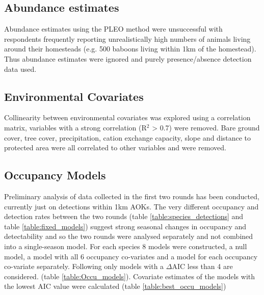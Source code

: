 \subsection{Abundance estimates}
Abundance estimates using the PLEO method were unsuccessful with respondents frequently reporting unrealistically high numbers of animals living around their homesteads (e.g. 500 baboons living within 1km of the homestead). Thus abundance estimates were ignored and purely presence/absence detection data used.

\subsection{Environmental Covariates}

Collinearity between environmental covariates was explored using a correlation matrix, variables with a strong correlation (R$^2$ > 0.7) were removed. Bare ground cover, tree cover, precipitation, cation exchange capacity, slope and distance to protected area were all correlated to other variables and were removed.

\subsection{Occupancy Models}
Preliminary analysis of data collected in the first two rounds has been conducted, currently just on detections within 1km AOKs. The very different occupancy and detection rates between the two rounds (table \ref{table:species_detections} and table \ref{table:fixed_models}) suggest strong seasonal changes in occupancy and detectability and so the two rounds were analysed separately and not combined into a single-season model. For each species 8 models were constructed, a null model, a model with all 6 occupancy co-variates and a model for each occupancy co-variate separately. Following \citet{Burnham2002} only models with a $\Delta$AIC less than 4 are considered. (table \ref{table:Occu_models}). Covariate estimates of the models with the lowest AIC value were calculated (table \ref{table:best_occu_models})

